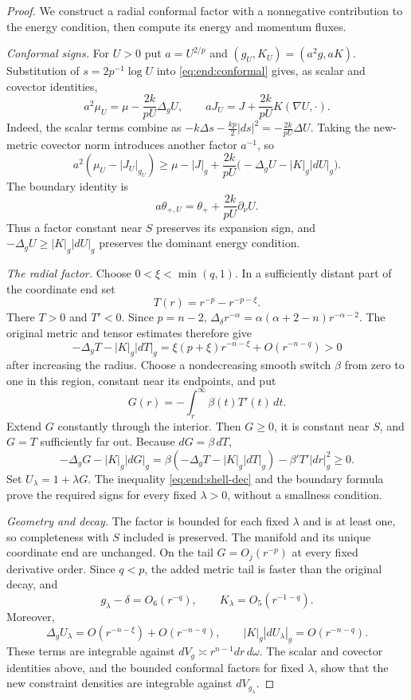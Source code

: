 \begin{proof}
We construct a radial conformal factor with a nonnegative contribution
to the energy condition, then compute its energy and momentum fluxes.

\emph{Conformal signs.} For $U>0$ put $a=U^{2/p}$ and
$(g_U,K_U)=(a^2g,aK)$.
Substitution of $s=2p^{-1}\log U$ into
\eqref{eq:end:conformal} gives, as scalar and covector identities,
\[
 a^2\mu_U=\mu-\frac{2k}{pU}\Delta_gU,\qquad
 aJ_U=J+\frac{2k}{pU}K(\nabla U,\cdot).
\]
Indeed, the scalar terms combine as
$-k\Delta s-\frac{kp}{2}|ds|^2=-\frac{2k}{pU}\Delta U$.
Taking the new-metric covector norm introduces another factor $a^{-1}$,
so
\begin{equation}\label{eq:end:shell-dec}
 a^2(\mu_U-|J_U|_{g_U})
 \ge \mu-|J|_g+\frac{2k}{pU}
       \bigl(-\Delta_gU-|K|_g|dU|_g\bigr).
\end{equation}
The boundary identity is
\[
 a\theta_{+,U}=\theta_++\frac{2k}{pU}\partial_\nu U.
\]
Thus a factor constant near $S$ preserves its expansion sign, and
$-\Delta_gU\ge |K|_g|dU|_g$ preserves the dominant energy condition.

\emph{The radial factor.} Choose $0<\xi<\min(q,1)$.
In a sufficiently distant part of the
coordinate end set
\[
 T(r)=r^{-p}-r^{-p-\xi}.
\]
There $T>0$ and $T'<0$. Since $p=n-2$,
$\Delta_\delta r^{-\alpha}=\alpha(\alpha+2-n)r^{-\alpha-2}$.
The original metric and tensor estimates therefore give
\[
 -\Delta_gT-|K|_g|dT|_g
 =\xi(p+\xi)r^{-n-\xi}+O(r^{-n-q})>0
\]
after increasing the radius. Choose a nondecreasing smooth switch
$\beta$ from zero to one in this region, constant near its endpoints,
and put
\[
 G(r)=-\int_r^\infty\beta(t)T'(t)\,dt.
\]
Extend $G$ constantly through the interior. Then $G\ge0$, it is constant
near $S$, and $G=T$ sufficiently far out. Because $dG=\beta\,dT$,
\[
 -\Delta_gG-|K|_g|dG|_g
 =\beta(-\Delta_gT-|K|_g|dT|_g)-\beta'T'|dr|_g^2\ge0.
\]
Set $U_\lambda=1+\lambda G$.  The inequality
\eqref{eq:end:shell-dec} and
the boundary formula prove the required signs for every fixed
$\lambda>0$, without a smallness condition.

\emph{Geometry and decay.} The factor is bounded for each fixed
$\lambda$ and is at least one,
so completeness with $S$ included is preserved. The manifold and
its unique coordinate end are unchanged. On the tail $G=O_j(r^{-p})$
at every fixed derivative order. Since $q<p$, the added metric tail
is faster than the original decay, and
\[
 g_\lambda-\delta=O_6(r^{-q}),\qquad
 K_\lambda=O_5(r^{-1-q}).
\]
Moreover,
\[
 \Delta_gU_\lambda=O(r^{-n-\xi})+O(r^{-n-q}),\qquad
 |K|_g|dU_\lambda|_g=O(r^{-n-q}).
\]
These terms are integrable against $dV_g\asymp r^{n-1}dr\,d\omega$.
The scalar and covector identities above, and the bounded conformal
factors for fixed $\lambda$, show that the new constraint densities
are integrable against $dV_{g_\lambda}$.


\end{proof}
